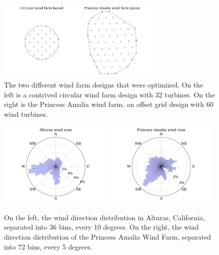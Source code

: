 \documentclass[WESD, manuscript]{copernicus}
\begin{document}
\begin{figure}[htbp]
  \centering
   \includegraphics[trim={0 0.5cm 0 0.4cm},clip,width=0.7\textwidth]{Figures/baseline_layouts.pdf}
  \caption{\label{layouts} The two different wind farm designs that were optimized. On the left is a contrived circular wind farm design with 32 turbines. On the right is the Princess Amalia wind farm, an offset grid design with 60 wind turbines. }
\end{figure}
%
\begin{figure}[htbp]
  \centering
  \includegraphics[width=0.49\textwidth]{Figures/alturas_rose.pdf}
  \includegraphics[width=0.49\textwidth]{Figures/amalia_rose.pdf}
  \caption{\label{wind_roses} On the left, the wind direction distribution in Alturas, California, separated into 36 bins, every 10 degrees. On the right, the wind direction distribution of the Princess Amalia Wind Farm, separated into 72 bins, every 5 degrees.}
\end{figure}
%
\end{document}
